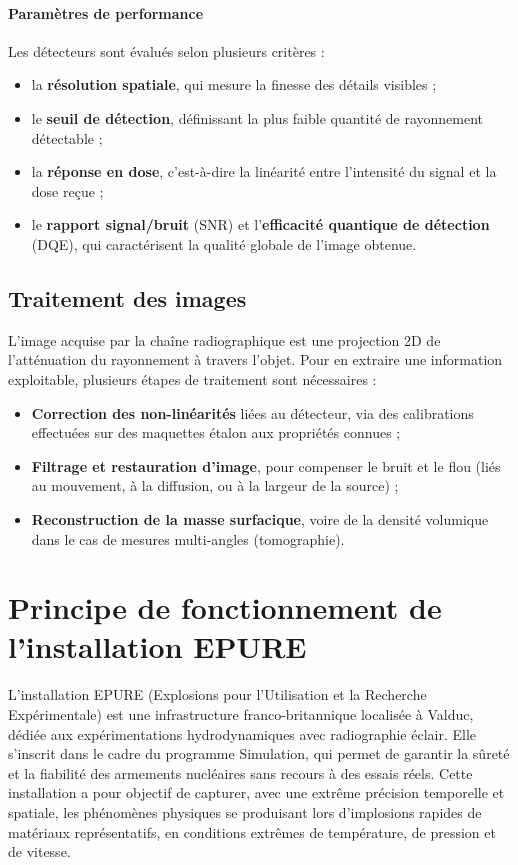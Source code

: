 \documentclass[12pt,a4paper]{report}
\begin{document}
\paragraph{Paramètres de performance} Les détecteurs sont évalués selon plusieurs critères :
\begin{itemize}
\item la \textbf{résolution spatiale}, qui mesure la finesse des détails visibles ;
\item le \textbf{seuil de détection}, définissant la plus faible quantité de rayonnement détectable ;
\item la \textbf{réponse en dose}, c’est-à-dire la linéarité entre l’intensité du signal et la dose reçue ;
\item le \textbf{rapport signal/bruit} (SNR) et l’\textbf{efficacité quantique de détection} (DQE), qui caractérisent la qualité globale de l’image obtenue.
\end{itemize}

\subsection{Traitement des images}
L’image acquise par la chaîne radiographique est une projection 2D de l’atténuation du rayonnement à travers l’objet. Pour en extraire une information exploitable, plusieurs étapes de traitement sont nécessaires :
\begin{itemize}
\item \textbf{Correction des non-linéarités} liées au détecteur, via des calibrations effectuées sur des maquettes étalon aux propriétés connues ;
\item \textbf{Filtrage et restauration d’image}, pour compenser le bruit et le flou (liés au mouvement, à la diffusion, ou à la largeur de la source) ;
\item \textbf{Reconstruction de la masse surfacique}, voire de la densité volumique dans le cas de mesures multi-angles (tomographie).
\end{itemize}

\section{Principe de fonctionnement de l'installation EPURE}
L’installation EPURE (Explosions pour l’Utilisation et la Recherche Expérimentale) est une infrastructure franco-britannique localisée à Valduc, dédiée aux expérimentations hydrodynamiques avec radiographie éclair. Elle s’inscrit dans le cadre du programme Simulation, qui permet de garantir la sûreté et la fiabilité des armements nucléaires sans recours à des essais réels. Cette installation a pour objectif de capturer, avec une extrême précision temporelle et spatiale, les phénomènes physiques se produisant lors d’implosions rapides de matériaux représentatifs, en conditions extrêmes de température, de pression et de vitesse.
\end{document}
